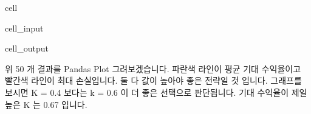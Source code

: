 \documentclass[letterpaper,10pt,english]{jupyterBook}
\begin{document}
\begin{sphinxuseclass}{cell}
\begin{sphinxVerbatimInput}
\begin{sphinxuseclass}{cell_input}
\end{sphinxuseclass}\end{sphinxVerbatimInput}
\begin{sphinxVerbatimOutput}

\begin{sphinxuseclass}{cell_output}
\begin{sphinxVerbatim}[commandchars=\\\{\}]
[0.         0.11111111 0.22222222 0.33333333 0.44444444 0.55555556
 0.66666667 0.77777778 0.88888889 1.        ]
\end{sphinxVerbatim}

\end{sphinxuseclass}\end{sphinxVerbatimOutput}

\end{sphinxuseclass}
\sphinxAtStartPar
위 50 개 결과를 Pandas Plot 그려보겠습니다. 파란색 라인이 평균 기대 수익율이고 빨간색 라인이 최대 손실입니다. 둘 다 값이 높아야 좋은 전략일 것 입니다. 그래프를 보시면 K = 0.4 보다는 k = 0.6 이 더 좋은 선택으로 판단됩니다. 기대 수익율이 제일 높은 K 는 0.67 입니다.
\end{document}
